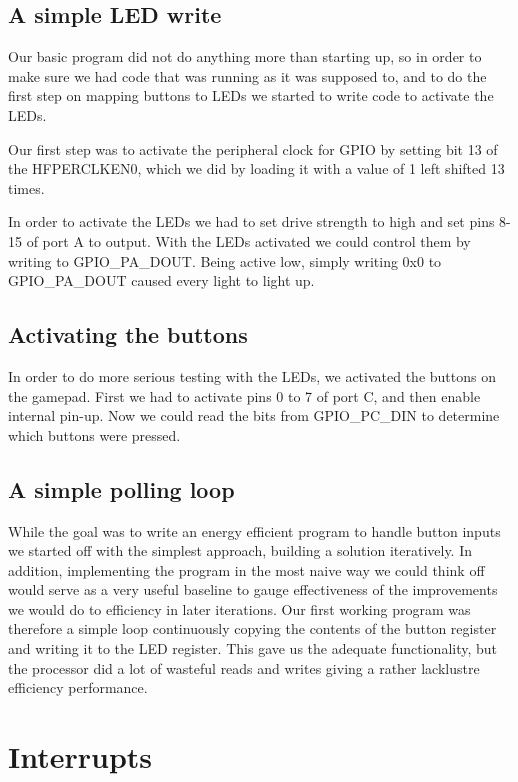 \subsection{A simple LED write}

Our basic program did not do anything more than starting up, so in order to make sure we had code that was running as it was supposed to, and to do the first step on mapping buttons to LEDs we started to write code to activate the LEDs. 

Our first step was to activate the peripheral clock for GPIO by setting bit 13 of the HFPERCLKEN0, which we did by loading it with a value of 1 left shifted 13 times.

In order to activate the LEDs we had to set drive strength to high and set pins 8-15 of port A to output. With the LEDs activated we could control them by writing to GPIO\_PA\_DOUT. Being active low, simply writing 0x0 to GPIO\_PA\_DOUT caused every light to light up. 

\subsection{Activating the buttons}

In order to do more serious testing with the LEDs, we activated the buttons on the gamepad. First we had to activate pins 0 to 7 of port C, and then enable internal pin-up. Now we could read the bits from GPIO\_PC\_DIN to determine which buttons were pressed.

\subsection{A simple polling loop}

While the goal was to write an energy efficient program to handle button inputs we started off with the simplest approach, building a solution iteratively. In addition, implementing the program in the most naive way we could think off would serve as a very useful baseline to gauge effectiveness of the improvements we would do to efficiency in later iterations. Our first working program was therefore a simple loop continuously copying the contents of the button register and writing it to the LED register. This gave us the adequate functionality, but the processor did a lot of wasteful reads and writes giving a rather lacklustre efficiency performance. 

\section{Interrupts}

